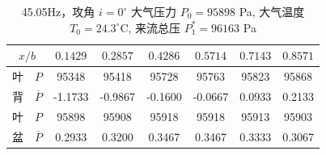 \begin{table}[H]
  \centering
  \caption[45.05Hz 攻角 $i=0^\circ$ 实验数据]{45.05Hz，攻角 $i=0^\circ$ 大气压力 $P_0=95898$ Pa, 大气温度 $T_0=24.3^\circ\text{C}$, 来流总压 $P_1^*=96163$ Pa}
  \label{tab:exp4_45.05Hz_0}
  \renewcommand{\arraystretch}{1.2}
  \begin{tabular}{cccccccc}
    \toprule
    \multicolumn{2}{c}{$x/b$} & $0.1429$ & $0.2857$ & $0.4286$ & $0.5714$ & $0.7143$ & $0.8571$ \\
    \midrule
    叶 & $P$ & 95348 & 95418 & 95728 & 95763 & 95823 & 95868 \\
    背 & $\overline{P}$ & -1.1733 & -0.9867 & -0.1600 & -0.0667 & 0.0933 & 0.2133 \\
    \midrule
    叶 & $P$ & 95898 & 95908 & 95918 & 95918 & 95913 & 95903 \\
    盆 & $\overline{P}$ & 0.2933 & 0.3200 & 0.3467 & 0.3467 & 0.3333 & 0.3067 \\
    \bottomrule
  \end{tabular}
\end{table}